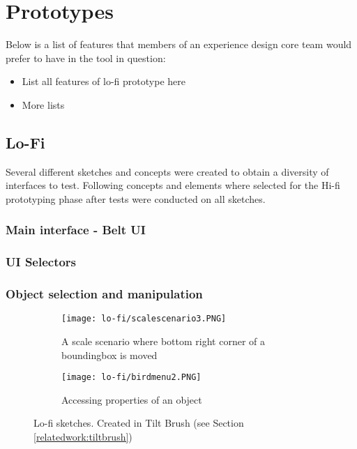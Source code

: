 \section{Prototypes}
\label{result:prototypes}
Below is a list of features that members of an experience design core team would prefer to have in the tool in question:
\begin{itemize}
  \item List all features of lo-fi prototype here
  \item More lists
\end{itemize}
\subsection{Lo-Fi}
 Several different sketches and concepts were created to obtain a diversity of interfaces to test. Following concepts and elements where selected for the Hi-fi prototyping phase after tests were conducted on all sketches.

\subsubsection{Main interface - Belt UI}

\subsubsection{UI Selectors}

\subsubsection{Object selection and manipulation}



\begin{figure}
\begin{subfigure}{.5\textwidth}
  \centering
  \texttt{[image: lo-fi/scalescenario3.PNG]}
  \caption{A scale scenario where bottom right corner of a boundingbox is moved}
  \label{fig:lofi:scale3}
\end{subfigure}%
\begin{subfigure}{.5\textwidth}
  \centering
  \texttt{[image: lo-fi/birdmenu2.PNG]}
  \caption{Accessing properties of an object}
  \label{fig:tilt:passivemenu}
\end{subfigure}
\caption{Lo-fi sketches. Created in Tilt Brush (see Section \ref{relatedwork:tiltbrush})}
\label{fig:tilt}
\end{figure}
